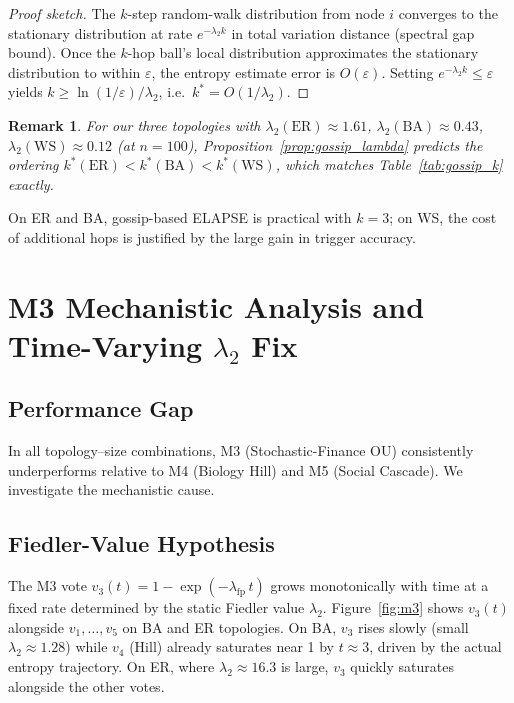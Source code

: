 \documentclass[review,12pt]{elsarticle}
\newcommand{\lambdat}{\lambda_2}
\newtheorem{remark}{Remark}
\begin{document}
\begin{proof}[Proof sketch]
The $k$-step random-walk distribution from node $i$ converges to the
stationary distribution at rate $e^{-\lambdat k}$ in total variation
distance (spectral gap bound).  Once the $k$-hop ball's local distribution
approximates the stationary distribution to within $\varepsilon$, the
entropy estimate error is $O(\varepsilon)$.  Setting $e^{-\lambdat k} \leq \varepsilon$
yields $k \geq \ln(1/\varepsilon)/\lambdat$, i.e.\ $k^* = O(1/\lambdat)$.
\end{proof}

\begin{remark}
For our three topologies with $\lambdat(\mathrm{ER})\approx 1.61$,
$\lambdat(\mathrm{BA})\approx 0.43$, $\lambdat(\mathrm{WS})\approx 0.12$
(at $n=100$), Proposition~\ref{prop:gossip_lambda} predicts the ordering
$k^*(\mathrm{ER}) < k^*(\mathrm{BA}) < k^*(\mathrm{WS})$,
which matches Table~\ref{tab:gossip_k} exactly.
\end{remark}

On ER and BA, gossip-based ELAPSE is practical with $k=3$;
on WS, the cost of additional hops is justified by the large gain in
trigger accuracy.

\section{M3 Mechanistic Analysis and Time-Varying $\lambda_2$ Fix}
\label{sec:m3}

\subsection{Performance Gap}

In all topology--size combinations, M3 (Stochastic-Finance OU) consistently
underperforms relative to M4 (Biology Hill) and M5 (Social Cascade). We
investigate the mechanistic cause.

\subsection{Fiedler-Value Hypothesis}

The M3 vote $v_3(t) = 1 - \exp(-\lambda_{\mathrm{fp}}\,t)$ grows
monotonically with time at a fixed rate determined by the static Fiedler
value $\lambdat$. Figure~\ref{fig:m3} shows $v_3(t)$ alongside $v_1,\ldots,v_5$
on BA and ER topologies. On BA, $v_3$ rises slowly (small $\lambdat \approx 1.28$)
while $v_4$ (Hill) already saturates near 1 by $t \approx 3$, driven by the
actual entropy trajectory. On ER, where $\lambdat \approx 16.3$ is large,
$v_3$ quickly saturates alongside the other votes.
\end{document}
